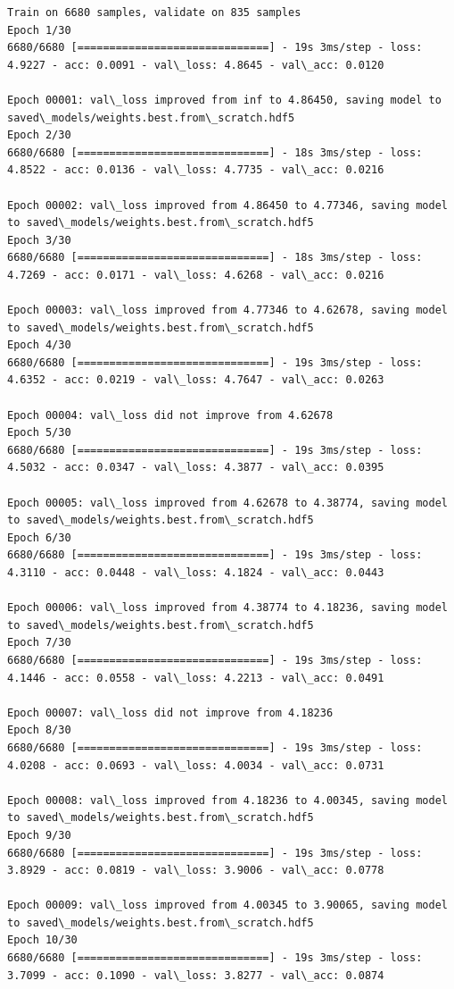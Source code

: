 \documentclass[11pt]{article}
\begin{document}
    \begin{Verbatim}[commandchars=\\\{\}]
Train on 6680 samples, validate on 835 samples
Epoch 1/30
6680/6680 [==============================] - 19s 3ms/step - loss: 4.9227 - acc: 0.0091 - val\_loss: 4.8645 - val\_acc: 0.0120

Epoch 00001: val\_loss improved from inf to 4.86450, saving model to saved\_models/weights.best.from\_scratch.hdf5
Epoch 2/30
6680/6680 [==============================] - 18s 3ms/step - loss: 4.8522 - acc: 0.0136 - val\_loss: 4.7735 - val\_acc: 0.0216

Epoch 00002: val\_loss improved from 4.86450 to 4.77346, saving model to saved\_models/weights.best.from\_scratch.hdf5
Epoch 3/30
6680/6680 [==============================] - 18s 3ms/step - loss: 4.7269 - acc: 0.0171 - val\_loss: 4.6268 - val\_acc: 0.0216

Epoch 00003: val\_loss improved from 4.77346 to 4.62678, saving model to saved\_models/weights.best.from\_scratch.hdf5
Epoch 4/30
6680/6680 [==============================] - 19s 3ms/step - loss: 4.6352 - acc: 0.0219 - val\_loss: 4.7647 - val\_acc: 0.0263

Epoch 00004: val\_loss did not improve from 4.62678
Epoch 5/30
6680/6680 [==============================] - 19s 3ms/step - loss: 4.5032 - acc: 0.0347 - val\_loss: 4.3877 - val\_acc: 0.0395

Epoch 00005: val\_loss improved from 4.62678 to 4.38774, saving model to saved\_models/weights.best.from\_scratch.hdf5
Epoch 6/30
6680/6680 [==============================] - 19s 3ms/step - loss: 4.3110 - acc: 0.0448 - val\_loss: 4.1824 - val\_acc: 0.0443

Epoch 00006: val\_loss improved from 4.38774 to 4.18236, saving model to saved\_models/weights.best.from\_scratch.hdf5
Epoch 7/30
6680/6680 [==============================] - 19s 3ms/step - loss: 4.1446 - acc: 0.0558 - val\_loss: 4.2213 - val\_acc: 0.0491

Epoch 00007: val\_loss did not improve from 4.18236
Epoch 8/30
6680/6680 [==============================] - 19s 3ms/step - loss: 4.0208 - acc: 0.0693 - val\_loss: 4.0034 - val\_acc: 0.0731

Epoch 00008: val\_loss improved from 4.18236 to 4.00345, saving model to saved\_models/weights.best.from\_scratch.hdf5
Epoch 9/30
6680/6680 [==============================] - 19s 3ms/step - loss: 3.8929 - acc: 0.0819 - val\_loss: 3.9006 - val\_acc: 0.0778

Epoch 00009: val\_loss improved from 4.00345 to 3.90065, saving model to saved\_models/weights.best.from\_scratch.hdf5
Epoch 10/30
6680/6680 [==============================] - 19s 3ms/step - loss: 3.7099 - acc: 0.1090 - val\_loss: 3.8277 - val\_acc: 0.0874


\end{Verbatim}
\end{document}
